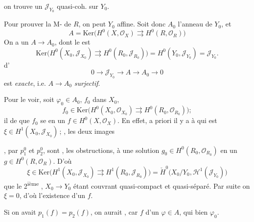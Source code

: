 \documentclass[11pt,a4paper]{article}
\begin{document}

on trouve un $\mathcal{J}_{Y_0}$ quasi-coh. sur $Y_0$.

Pour prouver la M- de $R$, on peut 
$Y_0$  affine. Soit donc $A_0$ l'anneau de $Y_0$, et 
\[
  A = \mathrm{Ker}\bigl(H^0(X, \mathcal{O}_X) \rightrightarrows
  H^0(R, \mathcal{O}_R)\bigr)
\]
On a un  $A \to A_0$, dont le  est
\[
  \mathrm{Ker}\bigl(H^0(X_0, \mathcal{J}_{X_0}) \rightrightarrows
  H^0(R_0, \mathcal{J}_{R_0})\bigr) = H^0(Y_0, \mathcal{J}_{Y_0}) =
  \mathcal{J}_{Y_0} .
\]
\ill{} d'\ill{} \struck{\ill{} \ill{}}
\[
  0 \to \mathcal{J}_{Y_0} \to A \to A_0 \to 0
\]
est \emph{exacte}, i.e. $A \to A_0$ \emph{surjectif}.

Pour le voir,  soit $\varphi_0 \in A_0$,  $f_0$ 
 dans $X_0$,
\[
  f_0 \in \mathrm{Ker}\bigl(H^0(X_0, \mathcal{O}_{X_0}) \rightrightarrows
  H^0(R_0, \mathcal{O}_{R_0})\bigr) ;
\]
il  de  que $f_0$ se 
en un $f \in H^0(X, \mathcal{O}_X)$. En effet, a priori il y a
 à  qui est \struck{\ill{}}
$\xi \in H^1(X_0, \mathcal{J}_{X_0})$\,; , les deux images


 , par $p_1^0$ et
$p_2^0$, sont ,  les
obstructions, à  une  solution
$g_0 \in H^0(R_0, \mathcal{O}_{R_0})$ en un $g \in H^0(R,
\mathcal{O}_R)$. D'où
\[
  \xi \in \mathrm{Ker}\bigl(H^1(X_0, \mathcal{J}_{X_0}) \rightrightarrows
  H^1(R_0, \mathcal{J}_{R_0})\bigr)
  = \check{H}^0\bigl(X_0/Y_0, \mathcal{H}^1(\mathcal{J}_{Y_0})\bigr)
\]
 que le 2\textsuperscript{ième}  ,
$X_0 \to Y_0$ étant couvrant quasi-compact et quasi-séparé. Par suite on 
$\xi = 0$, d'où l'existence d'un $f$.

Si on avait  $p_1(f) = p_2(f)$, on aurait
, car $f$  d'un $\varphi \in A$, qui
\struck{\ill{}}  bien $\varphi_0$.
\end{document}
